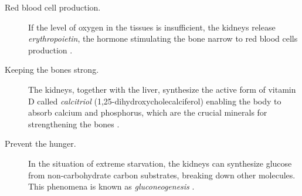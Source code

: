 \begin{description}
	\item [Red blood cell production.] If the level of oxygen in the tissues is insufficient, the kidneys release \textit{erythropoietin}, the hormone stimulating the bone narrow to red blood cells production \cite{donnelly2001erythropoietin}. 

\item [Keeping the bones strong.] The kidneys, together with the liver, synthesize the active form of vitamin D called \textit{calcitriol} (1,25-dihydroxycholecalciferol) enabling the body to absorb calcium and phosphorus, which are the crucial minerals for strengthening the bones \cite{williams2009vitamin}.

\item [Prevent the hunger.] In the situation of extreme starvation, the kidneys can synthesize glucose from non-carbohydrate carbon substrates, breaking down other molecules. This phenomena is known as \textit{gluconeogenesis} \cite{newsholme1967control}.
%					
	\end{description} 

